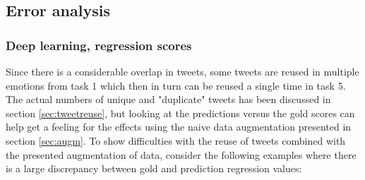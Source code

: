 \subsection{Error analysis} 
\subsubsection{Deep learning, regression scores} \label{sec:regscoredeep}
Since there is a considerable overlap in tweets, some tweets are reused in multiple emotions from task 1 which then in turn can be reused a single time in task 5. The actual numbers of unique and "duplicate" tweets has been discussed in section \ref{sec:tweetreuse}, but looking at the predictions versus the gold scores can help get a feeling for the effects using the naive data augmentation presented in section \ref{sec:augm}. To show difficulties with the reuse of tweets combined with the presented augmentation of data, consider the following examples where there is a large discrepancy between gold and prediction regression values:\\
